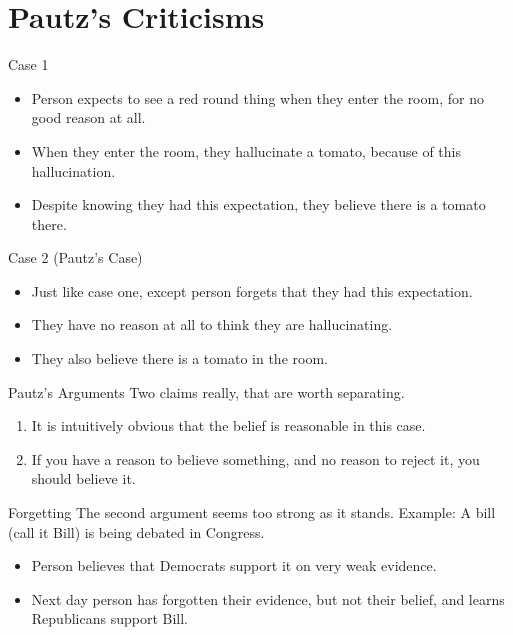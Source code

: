 \documentclass[
  17pt,
  letterpaper,
  ignorenonframetext,
  aspectratio=169,
  xcolor={dvipsnames}]{beamer}
\providecommand{\tightlist}{%
  \setlength{\itemsep}{0pt}\setlength{\parskip}{0pt}}\usepackage{longtable,booktabs,array}
\begin{document}
\hypertarget{pautzs-criticisms}{%
\section{Pautz's Criticisms}\label{pautzs-criticisms}}

\begin{frame}
Case 1

\begin{itemize}[<+->]
\tightlist
\item
  Person expects to see a red round thing when they enter the room, for
  no good reason at all.
\item
  When they enter the room, they hallucinate a tomato, because of this
  hallucination.
\item
  Despite knowing they had this expectation, they believe there is a
  tomato there.
\end{itemize}
\end{frame}

\begin{frame}
Case 2 (Pautz's Case)

\begin{itemize}[<+->]
\tightlist
\item
  Just like case one, except person forgets that they had this
  expectation.
\item
  They have no reason at all to think they are hallucinating.
\item
  They also believe there is a tomato in the room.
\end{itemize}
\end{frame}

\begin{frame}{Pautz's Arguments}
\protect\hypertarget{pautzs-arguments}{}
Two claims really, that are worth separating.

\begin{enumerate}[<+->]
\tightlist
\item
  It is intuitively obvious that the belief is reasonable in this case.
\item
  If you have a reason to believe something, and no reason to reject it,
  you should believe it.
\end{enumerate}
\end{frame}

\begin{frame}{Forgetting}
\protect\hypertarget{forgetting}{}
The second argument seems too strong as it stands. Example: A bill (call
it Bill) is being debated in Congress.

\begin{itemize}[<+->]
\tightlist
\item
  Person believes that Democrats support it on very weak evidence.
\item
  Next day person has forgotten their evidence, but not their belief,
  and learns Republicans support Bill.
\end{itemize}
\end{frame}
\end{document}
